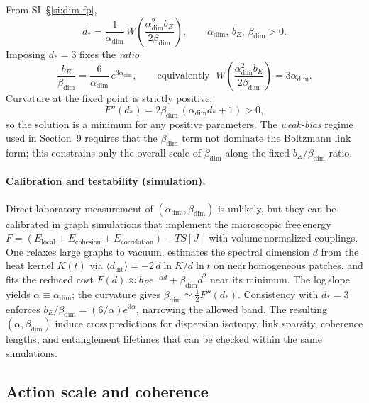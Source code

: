 \documentclass[11pt]{article}
\begin{document}
From SI~\S\ref{si:dim-fp},
\begin{equation}
d_* = \frac{1}{\alpha_{\mathrm{dim}}}\, W\!\left( \frac{\alpha_{\mathrm{dim}}^2 b_E}{2\beta_{\mathrm{dim}}} \right),\qquad \alpha_{\mathrm{dim}},\, b_E,\, \beta_{\mathrm{dim}} > 0.
\end{equation}
Imposing $d_*=3$ fixes the \emph{ratio}
\begin{equation}
\frac{b_E}{\beta_{\mathrm{dim}}} = \frac{6}{\alpha_{\mathrm{dim}}}\, e^{3\alpha_{\mathrm{dim}}},\qquad \text{equivalently }\; W\!\left( \frac{\alpha_{\mathrm{dim}}^2 b_E}{2\beta_{\mathrm{dim}}} \right)=3\alpha_{\mathrm{dim}}.
\end{equation}
Curvature at the fixed point is strictly positive,
\begin{equation}
F''(d_*) = 2\beta_{\mathrm{dim}}\,(\alpha_{\mathrm{dim}} d_* + 1) > 0,
\end{equation}
so the solution is a minimum for any positive parameters. The \emph{weak-bias} regime used in Section~9 requires that the $\beta_{\mathrm{dim}}$ term not dominate the Boltzmann link form; this constrains only the overall scale of $\beta_{\mathrm{dim}}$ along the fixed $b_E/\beta_{\mathrm{dim}}$ ratio.

\paragraph{Calibration and testability (simulation).} Direct laboratory measurement of $(\alpha_{\mathrm{dim}},\beta_{\mathrm{dim}})$ is unlikely, but they can be calibrated in graph simulations that implement the microscopic free\,energy $F=(E_{\text{local}}+E_{\text{cohesion}}+E_{\text{correlation}})-T S[J]$ with volume\,normalized couplings. One relaxes large graphs to vacuum, estimates the spectral dimension $d$ from the heat kernel $K(t)$ via $\langle d_{\text{int}}\rangle=-2\,d\ln K/d\ln t$ on near\,homogeneous patches, and fits the reduced cost $F(d)\approx b_E e^{-\alpha d}+\beta_{\mathrm{dim}} d^2$ near its minimum. The log\,slope yields $\alpha\equiv\alpha_{\mathrm{dim}}$; the curvature gives $\beta_{\mathrm{dim}}\simeq \tfrac12 F''(d_*)$. Consistency with $d_*=3$ enforces $b_E/\beta_{\mathrm{dim}}=(6/\alpha) e^{3\alpha}$, narrowing the allowed band. The resulting $(\alpha,\beta_{\mathrm{dim}})$ induce cross\,predictions for dispersion isotropy, link sparsity, coherence lengths, and entanglement lifetimes that can be checked within the same simulations.

\subsection{Action scale and coherence}
\end{document}
